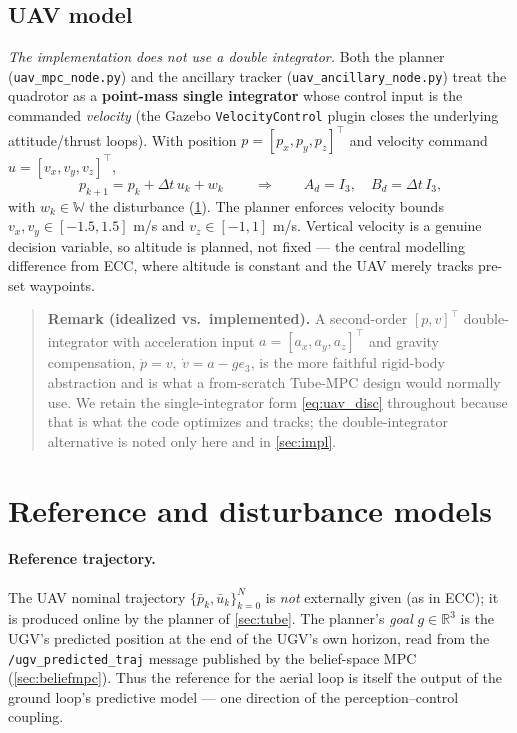 \documentclass[11pt]{article}
\newcommand{\R}{\mathbb{R}}
\newcommand{\W}{\mathbb{W}}
\newcommand{\bu}{\bar{u}}
\newcommand{\bp}{\bar{p}}
\newcommand{\code}[1]{\texttt{#1}}
\begin{document}
\subsection{UAV model}
\label{sec:uavmodel}
\emph{The implementation does not use a double integrator.} Both the planner (\code{uav\_mpc\_node.py}) and
the ancillary tracker (\code{uav\_ancillary\_node.py}) treat the quadrotor as a \textbf{point-mass single
integrator} whose control input is the commanded \emph{velocity} (the Gazebo \code{VelocityControl} plugin
closes the underlying attitude/thrust loops). With position $p=[p_x,p_y,p_z]^\top$ and velocity command
$u=[v_x,v_y,v_z]^\top$,
\begin{equation}
\boxed{\,p_{k+1} = p_k + \Delta t\,u_k + w_k\,}
\qquad\Longrightarrow\qquad
A_d = I_3,\quad B_d = \Delta t\,I_3,
\label{eq:uav_disc}
\end{equation}
with $w_k\in\W$ the disturbance (\cref{sec:refs}). The planner enforces velocity bounds
$v_x,v_y\in[-1.5,1.5]$ m/s and $v_z\in[-1,1]$ m/s. Vertical velocity is a genuine decision variable, so
altitude is planned, not fixed --- the central modelling difference from ECC, where altitude is constant
and the UAV merely tracks pre-set waypoints.

\begin{quote}\small
\textbf{Remark (idealized vs.\ implemented).} A second-order $[p,v]^\top$ double-integrator with acceleration
input $a=[a_x,a_y,a_z]^\top$ and gravity compensation, $\dot p = v,\ \dot v = a - g e_3$, is the more faithful
rigid-body abstraction and is what a from-scratch Tube-MPC design would normally use. We retain the
single-integrator form \cref{eq:uav_disc} throughout because that is what the code optimizes and tracks; the
double-integrator alternative is noted only here and in \cref{sec:impl}.
\end{quote}

\section{Reference and disturbance models}
\label{sec:refs}

\paragraph{Reference trajectory.} The UAV nominal trajectory $\{\bp_k,\bu_k\}_{k=0}^{N}$ is \emph{not}
externally given (as in ECC); it is produced online by the planner of \cref{sec:tube}. The planner's
\emph{goal} $g\in\R^3$ is the UGV's predicted position at the end of the UGV's own horizon, read from the
\code{/ugv\_predicted\_traj} message published by the belief-space MPC (\cref{sec:beliefmpc}). Thus the
reference for the aerial loop is itself the output of the ground loop's predictive model --- one direction of
the perception--control coupling.
\end{document}
